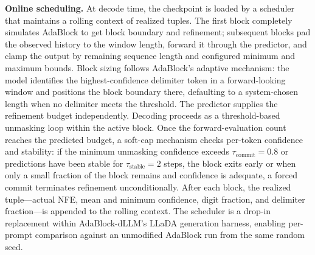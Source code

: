 \documentclass[11pt]{article}
\begin{document}
\textbf{Online scheduling.} At decode time, the checkpoint is loaded by a scheduler that maintains a rolling context of realized tuples. 
The first block completely simulates AdaBlock to get block boundary and refinement; subsequent blocks pad the observed history to the window length, forward it through the predictor, and clamp the output by remaining sequence length and configured minimum and maximum bounds.
Block sizing follows AdaBlock's adaptive mechanism: the model identifies the highest-confidence delimiter token in a forward-looking window and positions the block boundary there, defaulting to a system-chosen length when no delimiter meets the threshold. 
The predictor supplies the refinement budget independently. Decoding proceeds as a threshold-based unmasking loop within the active block. Once the forward-evaluation count reaches the predicted budget, a soft-cap mechanism checks per-token confidence and stability: 
if the minimum unmasking confidence exceeds \(\tau_{\text{commit}} = 0.8\) or predictions have been stable for \(\tau_{\text{stable}} = 2\) steps, the block exits early or
when only a small fraction of the block remains and confidence is adequate, a forced commit terminates refinement unconditionally. 
After each block, the realized tuple---actual NFE, mean and minimum confidence, digit fraction, and delimiter fraction---is appended to the rolling context. 
The scheduler is a drop-in replacement within AdaBlock-dLLM's LLaDA generation harness, enabling per-prompt comparison against an unmodified AdaBlock run from the same random seed.
\end{document}

